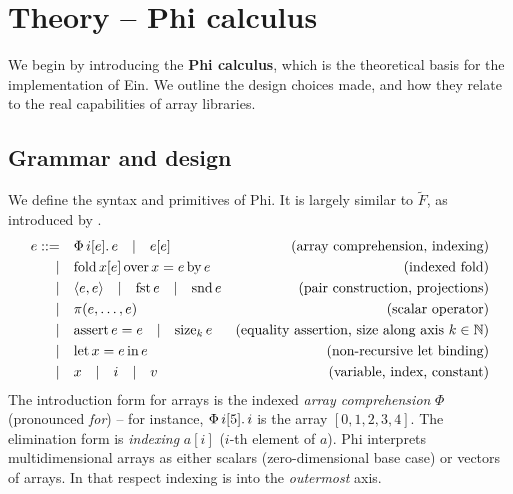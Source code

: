 \section{Theory -- Phi calculus}
\label{phi-calculus}

We begin by introducing the \textbf{Phi calculus}, which is the theoretical basis for the implementation of Ein. We outline the design choices made, and how they relate to the real capabilities of array libraries.

\subsection{Grammar and design}

\newcommand{\philet}[3]{\mathrm{let}\,{#1}={#2}\,\mathrm{in}\,{#3}}
\newcommand{\phivec}[3]{\Phi\, {#1}[{#2}] \ldotp {#3}}
\newcommand{\phifold}[5]{\mathrm{fold}\,{#1}[{#2}]\,\mathrm{over}\,{#3} = {#4}\,\mathrm{by}\,{#5}}
\newcommand{\phipair}[2]{\left\langle {#1}, {#2} \right\rangle}
\newcommand{\phifst}[1]{\mathrm{fst}\,{#1}}
\newcommand{\phisnd}[1]{\mathrm{snd}\,{#1}}
\newcommand{\phisize}[2]{\mathrm{size}_{#2}\, {#1}}
\newcommand{\phiasserteq}[2]{\mathrm{assert}\,{#1}={#2}}

We define the syntax and primitives of Phi. It is largely similar to $\tilde F$, as introduced by \textcite{shaikhha2019efficient}.
\begin{align*}
e ::=&\quad \phivec{i}{e}{e} \quad|\quad e[e]   &\text{(array comprehension, indexing)} \\
|&\quad \phifold{x}{e}{x}{e}{e}  &\text{(indexed fold)} \\
|&\quad \phipair{e}{e} \quad|\quad \phifst{e} \quad|\quad \phisnd{e} &\text{(pair construction, projections)} \\
|&\quad \pi(e, \dots, e) &\text{(scalar operator)} \\
|&\quad \phiasserteq{e}{e} \quad|\quad \phisize{e}{k} &\text{(equality assertion, size along axis } k \in \mathbb N \text{)} \\
|&\quad \philet{x}{e}{e} &\text{(non-recursive let binding)} \\
|&\quad x \quad|\quad i \quad|\quad v &\text{(variable, index, constant)}
\end{align*}
The introduction form for arrays is the indexed \textit{array comprehension} $\Phi$ (pronounced \textit{for}) -- for instance, $\phivec{i}{5}{i}$ is the array $[0, 1, 2, 3, 4]$. The elimination form is \textit{indexing} $a[i]$ ($i$-th element of $a$). Phi interprets multidimensional arrays as either scalars (zero-dimensional base case) or vectors of arrays. In that respect indexing is into the \textit{outermost} axis. 


